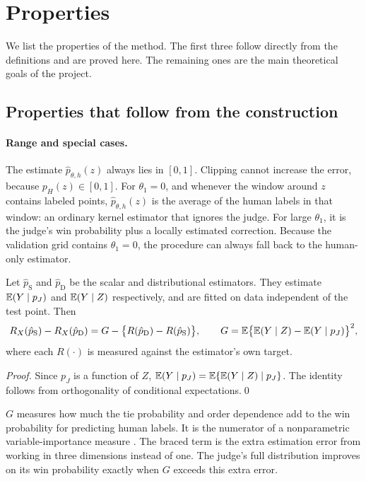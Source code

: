 \section{Properties}
\label{sec:properties}

We list the properties of the method. The first three follow directly from the definitions and are
proved here. The remaining ones are the main theoretical goals of the project.

\subsection{Properties that follow from the construction}

\paragraph{Range and special cases.}
The estimate $\hat p_{\theta,h}(z)$ always lies in $[0,1]$. Clipping cannot increase the error,
because $p_H(z)\in[0,1]$. For $\theta_1=0$, and whenever the window around $z$ contains labeled
points, $\hat p_{\theta,h}(z)$ is the average of the human labels in that window: an ordinary kernel
estimator that ignores the judge. For large $\theta_1$, it is the judge's win probability plus a
locally estimated correction. Because the validation grid contains $\theta_1=0$, the procedure can
always fall back to the human-only estimator.

\begin{proposition}
\label{prop:value}
Let $\hat p_{\mathrm S}$ and $\hat p_{\mathrm D}$ be the scalar and distributional estimators. They
estimate $\mathbb{E}(Y\mid p_J)$ and $\mathbb{E}(Y\mid Z)$ respectively, and are fitted on data independent of the
test point. Then
\[
  R_X(\hat p_{\mathrm S})-R_X(\hat p_{\mathrm D})
  =G-\bigl\{R(\hat p_{\mathrm D})-R(\hat p_{\mathrm S})\bigr\},
  \qquad
  G=\mathbb{E}\bigl\{\mathbb{E}(Y\mid Z)-\mathbb{E}(Y\mid p_J)\bigr\}^2 ,
\]
where each $R(\cdot)$ is measured against the estimator's own target.
\end{proposition}

\noindent\emph{Proof.} Since $p_J$ is a function of $Z$, $\mathbb{E}(Y\mid p_J)=\mathbb{E}\{\mathbb{E}(Y\mid Z)\mid p_J\}$.
The identity follows from orthogonality of conditional expectations.\qed

\medskip
$G$ measures how much the tie probability and order dependence add to the win probability for
predicting human labels. It is the numerator of a nonparametric variable-importance measure
\citep{williamson2021nonparametric,williamson2023general}. The braced term is the extra estimation
error from working in three dimensions instead of one. The judge's full distribution improves on
its win probability exactly when $G$ exceeds this extra error.

